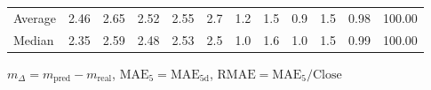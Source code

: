 \begin{threeparttable}
{\begin{tabular}{lrrrrrrrrrrr}
Average &          2.46 &          2.65 &          2.52 &        2.55 &                 2.7 &                 1.2 &        1.5 &                 0.9 &              1.5 &            0.98 &                 100.00 \\
 Median &          2.35 &          2.59 &          2.48 &        2.53 &                 2.5 &                 1.0 &        1.6 &                 1.0 &              1.5 &            0.99 &                 100.00 \\
\bottomrule
\end{tabular}
}
\begin{tablenotes}\footnotesize
\item $m_\Delta=m_{\text{pred}}-m_{\text{real}}$,
$\mathrm{MAE}_5=\mathrm{MAE}_{5\text{d}}$,
$\mathrm{RMAE}=\mathrm{MAE}_5/\text{Close}$
\end{tablenotes}
\end{threeparttable}
\endgroup

